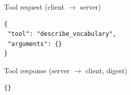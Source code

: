 \begin{mcpbox}{Tool request (client $\rightarrow$ server)}
\begin{lstlisting}[style=jsonstyle]
{
 "tool": "describe_vocabulary",
 "arguments": {}
}
\end{lstlisting}
\end{mcpbox}
\begin{mcpbox}{Tool response (server $\rightarrow$ client, digest)}
\begin{lstlisting}[style=jsonstyle]
{}
\end{lstlisting}
\end{mcpbox}